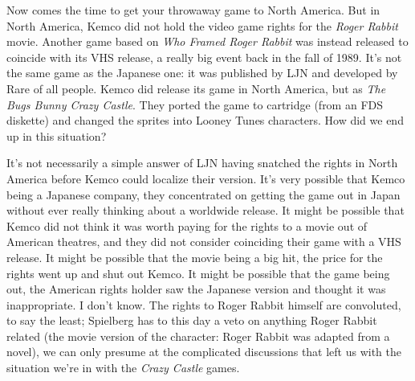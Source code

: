 \documentclass{book}
\let\oldcenter\center
\let\oldendcenter\endcenter
\renewenvironment{center}{\setlength\topsep{0pt}\oldcenter}{\oldendcenter}
\begin{document}
\begin{center}
\vspace{8pt}
\quad\vspace{4pt}
\end{center}
Now comes the time to get your throwaway game to North America. But in North America, Kemco did not hold the video game rights for the \emph{Roger Rabbit} movie. Another game based on \emph{Who Framed Roger Rabbit} was instead released to coincide with its VHS release, a really big event back in the fall of 1989. It’s not the same game as the Japanese one: it was published by LJN and developed by Rare of all people. Kemco did release its game in North America, but as \emph{The Bugs Bunny Crazy Castle}. They ported the game to cartridge (from an FDS diskette) and changed the sprites into Looney Tunes characters. How did we end up in this situation?

It’s not necessarily a simple answer of LJN having snatched the rights in North America before Kemco could localize their version. It’s very possible that Kemco being a Japanese company, they concentrated on getting the game out in Japan without ever really thinking about a worldwide release. It might be possible that Kemco did not think it was worth paying for the rights to a movie out of American theatres, and they did not consider coinciding their game with a VHS release. It might be possible that the movie being a big hit, the price for the rights went up and shut out Kemco. It might be possible that the game being out, the American rights holder saw the Japanese version and thought it was inappropriate. I don’t know. The rights to Roger Rabbit himself are convoluted, to say the least; Spielberg has to this day a veto on anything Roger Rabbit related (the movie version of the character: Roger Rabbit was adapted from a novel), we can only presume at the complicated discussions that left us with the situation we’re in with the \emph{Crazy Castle} games.
\end{document}
